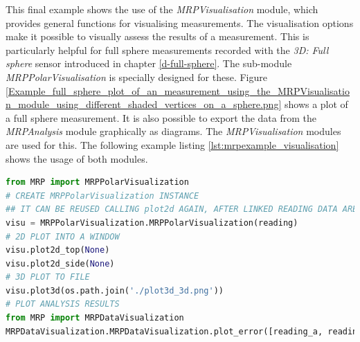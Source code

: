 This final example shows the use of the \emph{MRPVisualisation} module,
which provides general functions for visualising measurements. The
visualisation options make it possible to visually assess the results of
a measurement. This is particularly helpful for full sphere measurements
recorded with the \emph{3D: Full sphere} sensor introduced in chapter
\ref{d-full-sphere}. The sub-module \emph{MRPPolarVisualisation} is
specially designed for these. Figure
\ref{Example_full_sphere_plot_of_an_measurement_using_the_MRPVisualisation_module_using_different_shaded_vertices_on_a_sphere.png}
shows a plot of a full sphere measurement. It is also possible to export
the data from the \emph{MRPAnalysis} module graphically as diagrams. The
\emph{MRPVisualisation} modules are used for this. The following example
listing \ref{lst:mrpexample_visualisation} shows the usage of both
modules.

\begin{lstlisting}[language=Python, caption={MRPVisualisation example which plots a full sphere to an image file}, label=lst:mrpexample_visualisation]
from MRP import MRPPolarVisualization
# CREATE MRPPolarVisualization INSTANCE
## IT CAN BE REUSED CALLING plot2d AGAIN, AFTER LINKED READING DATA ARE MODIFIED
visu = MRPPolarVisualization.MRPPolarVisualization(reading)
# 2D PLOT INTO A WINDOW
visu.plot2d_top(None)
visu.plot2d_side(None)
# 3D PLOT TO FILE
visu.plot3d(os.path.join('./plot3d_3d.png'))
# PLOT ANALYSIS RESULTS
from MRP import MRPDataVisualization
MRPDataVisualization.MRPDataVisualization.plot_error([reading_a, reading_b, reading_c])
\end{lstlisting}

